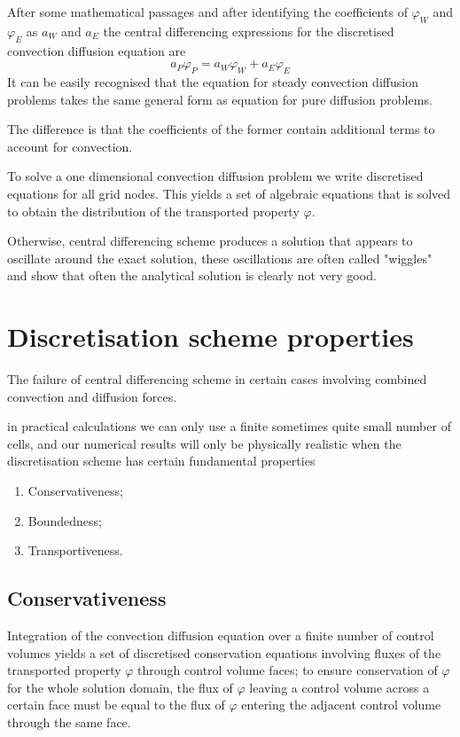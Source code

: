 \documentclass[a4paper, 15pt]{article}
\begin{document}
After some mathematical passages and after identifying
the coefficients of $\varphi_W$ and $\varphi_E$ as $a_W$ and $a_E$ the central differencing expressions for
the discretised convection diffusion equation are
\[a_P\varphi_P = a_W\varphi_W + a_E\varphi_E\]
It
can be easily recognised that the equation for steady convection diffusion problems takes the
same general form as equation for pure diffusion problems. \newline

The
difference is that the coefficients of the former contain additional terms to account for
convection. 

To
solve a one dimensional convection diffusion problem we write discretised equations for all
grid nodes. 
This
yields a set of algebraic equations that is solved to obtain the distribution of the transported
property $\varphi$.  \newline 

Otherwise,
central differencing scheme produces a solution that appears to oscillate around the exact
solution, these
oscillations are often called "wiggles" and show that often the analytical
solution is clearly not very good.  

\section{Discretisation scheme properties}

The
failure of central differencing scheme in certain cases involving combined convection and diffusion
forces. \newline 

in practical calculations we can only use a finite sometimes quite small number of
cells, and our numerical results will only be physically realistic when the discretisation scheme
has certain fundamental properties
\begin{enumerate}
	\item Conservativeness;
	\item Boundedness;
	\item Transportiveness. 
\end{enumerate}

\subsection{Conservativeness}

Integration
of the convection diffusion equation over a finite number of control volumes yields a
set of discretised conservation equations involving fluxes of the transported property $\varphi$ through
control volume faces; to
ensure conservation of $\varphi$ for the whole solution domain, the flux of $\varphi$ leaving a control volume
across a certain face must be equal to the flux of $\varphi$ entering the adjacent control volume through
the same face.
\end{document}
